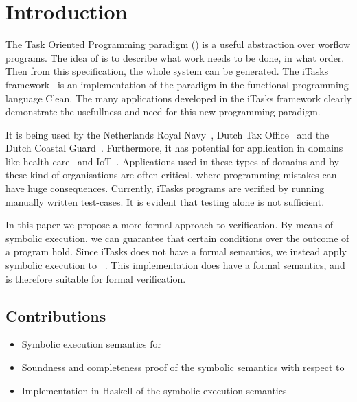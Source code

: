 


\section{Introduction}

The Task Oriented Programming paradigm (\TOP) is a useful abstraction over worflow programs.
The idea of \TOP is to describe what work needs to be done, in what order.
Then from this specification, the whole system can be generated.
The iTasks framework~\cite{DBLP:conf/ppdp/PlasmeijerLMAK12} is an implementation of the paradigm in the functional programming language Clean.
The many applications developed in the iTasks framework clearly demonstrate the usefullness and need for this new programming paradigm.

It is being used by the Netherlands Royal Navy~\cite{jansen2018dynamic}, Dutch Tax Office~\cite{} and the Dutch Coastal Guard~\cite{lijnse2012incidone}. %
Furthermore, it has potential for application in domains like health-care~\cite{} and IoT~\cite{DBLP:conf/cgo/KoopmanLP18}.
Applications used in these types of domains and by these kind of organisations are often critical, where programming mistakes can have huge consequences.
Currently, iTasks programs are verified by running manually written test-cases. %
It is evident that testing alone is not sufficient.

In this paper we propose a more formal approach to verification.
By means of symbolic execution, we can guarantee that certain conditions over the outcome of a \TOP program hold.
Since iTasks does not have a formal semantics, we instead apply symbolic execution to \TOPHAT~\cite{Steenvoorden2019}.
This \TOP implementation does have a formal semantics, and is therefore suitable for formal verification.

\subsection{Contributions}

\begin{itemize}
  \item Symbolic execution semantics for \TOPHAT
  \item Soundness and completeness proof of the symbolic semantics with respect to \TOPHAT
  \item Implementation in Haskell of the symbolic execution semantics
\end{itemize}

